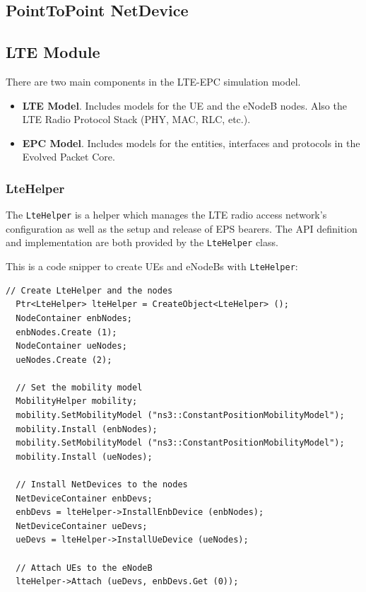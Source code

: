 \subsection{PointToPoint NetDevice}


\subsection{LTE Module}
There are two main components in the LTE-EPC simulation model.

\begin{itemize}[topsep=0pt, noitemsep]
  \item \textbf{LTE Model}. Includes models for the UE and the eNodeB nodes. Also the LTE Radio Protocol
  Stack (PHY, MAC, RLC, etc.).

  \item \textbf{EPC Model}. Includes models for the entities, interfaces and protocols in the Evolved Packet Core.
\end{itemize}

\subsubsection{LteHelper}
The \texttt{LteHelper} is a helper which manages the LTE radio access network's 
configuration as well as the setup and release of EPS bearers. The API definition and 
implementation are both provided by the \texttt{LteHelper} class.

This is a code snipper to create UEs and eNodeBs with \texttt{LteHelper}:

\begin{lstlisting}[language=myC++,caption={LteHelper usage}, captionpos=b]
  // Create LteHelper and the nodes
  Ptr<LteHelper> lteHelper = CreateObject<LteHelper> ();
  NodeContainer enbNodes;
  enbNodes.Create (1);
  NodeContainer ueNodes;
  ueNodes.Create (2);

  // Set the mobility model
  MobilityHelper mobility;
  mobility.SetMobilityModel ("ns3::ConstantPositionMobilityModel");
  mobility.Install (enbNodes);
  mobility.SetMobilityModel ("ns3::ConstantPositionMobilityModel");
  mobility.Install (ueNodes);

  // Install NetDevices to the nodes
  NetDeviceContainer enbDevs;
  enbDevs = lteHelper->InstallEnbDevice (enbNodes);
  NetDeviceContainer ueDevs;
  ueDevs = lteHelper->InstallUeDevice (ueNodes);  

  // Attach UEs to the eNodeB
  lteHelper->Attach (ueDevs, enbDevs.Get (0));
\end{lstlisting}

